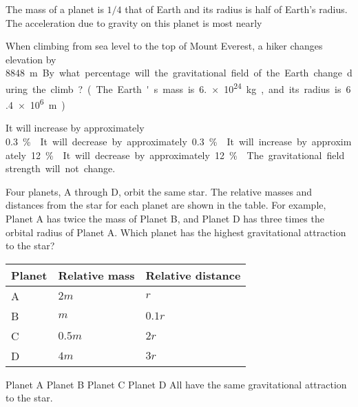 \documentclass{../../oss-classkick-exam}
\begin{document}
\begin{questions}
\begin{multicols*}{2}
    \question The mass of a planet is $1/4$ that of Earth and its radius is
    half of Earth's radius. The acceleration due to gravity on this planet is
    most nearly
    
    \question When climbing from sea level to the top of Mount Everest, a hiker
    changes elevation by \SI{8848}\metre. By what percentage will the
    gravitational field of the Earth change during the climb? (The Earth's
    mass is \SI{6.e24}{\kilo\gram}, and its radius is \SI{6.4e6}\metre.)
    \begin{choices}
      \choice It will increase by approximately \SI{.3}\percent.
      \choice It will decrease by approximately \SI{.3}\percent.
      \choice It will increase by approximately \SI{12}\percent.
      \choice It will decrease by approximately \SI{12}\percent.
      \choice The gravitational field strength will not change.
    \end{choices}
    \vspace{.7in}
    
    \question Four planets, A through D, orbit the same star. The relative
    masses and distances from the star for each planet are shown in the table.
    For example, Planet A has twice the mass of Planet B, and Planet D has
    three times the orbital radius of Planet A. Which planet has the highest
    gravitational attraction to the star?
    \begin{center}
      \vspace{-.1in}
      \begin{tabular}{lll}
        \hline
        \textbf{Planet} & \textbf{Relative mass} & \textbf{Relative distance}\\
        \hline
        A\hspace{.4in}& $2m$     & $r$    \\ \hline
        B & $m$                  & $0.1r$\hspace{.25in} \\ \hline
        C & $0.5m$\hspace{.25in} & $2r$   \\ \hline
        D & $4m$                 & $3r$   \\ \hline
      \end{tabular}
    \end{center}
    \begin{choices}
      \choice Planet A
      \choice Planet B
      \choice Planet C
      \choice Planet D
      \choice All have the same gravitational attraction to the star.
    \end{choices}
    \columnbreak
    

\end{multicols*}
\end{questions}
\end{document}
